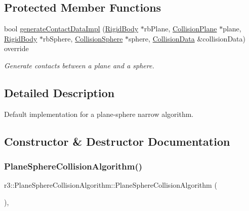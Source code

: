 \subsection*{Protected Member Functions}
\begin{DoxyCompactItemize}
\item 
bool \mbox{\hyperlink{classr3_1_1_plane_sphere_collision_algorithm_a6823dc80b23ce77beabd26a9c2a9d9ed}{generate\+Contact\+Data\+Impl}} (\mbox{\hyperlink{classr3_1_1_rigid_body}{Rigid\+Body}} $\ast$rb\+Plane, \mbox{\hyperlink{classr3_1_1_collision_plane}{Collision\+Plane}} $\ast$plane, \mbox{\hyperlink{classr3_1_1_rigid_body}{Rigid\+Body}} $\ast$rb\+Sphere, \mbox{\hyperlink{classr3_1_1_collision_sphere}{Collision\+Sphere}} $\ast$sphere, \mbox{\hyperlink{classr3_1_1_collision_data}{Collision\+Data}} \&collision\+Data) override
\begin{DoxyCompactList}\small\item\em Generate contacts between a plane and a sphere. \end{DoxyCompactList}\end{DoxyCompactItemize}


\subsection{Detailed Description}
Default implementation for a plane-\/sphere narrow algorithm. 

\subsection{Constructor \& Destructor Documentation}
\mbox{\label{classr3_1_1_plane_sphere_collision_algorithm_ab81963394bb97fcee3863f4f2c1aab7a}} 
\subsubsection{\texorpdfstring{Plane\+Sphere\+Collision\+Algorithm()}{PlaneSphereCollisionAlgorithm()}}
{\footnotesize\ttfamily r3\+::\+Plane\+Sphere\+Collision\+Algorithm\+::\+Plane\+Sphere\+Collision\+Algorithm (\begin{DoxyParamCaption}{ }\end{DoxyParamCaption})\hspace{0.3cm}{\ttfamily [explicit]}, {\ttfamily [default]}}


